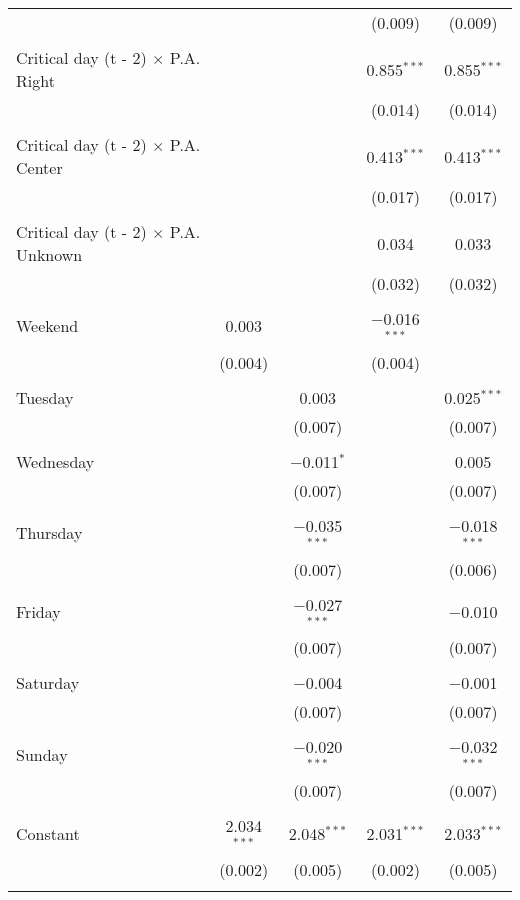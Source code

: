 \documentclass[
]{article}
\begin{document}
\begin{table}[!htbp]
{\begin{tabular}{@{\extracolsep{5pt}}lcccc}
  &  &  & (0.009) & (0.009) \\ 
  & & & & \\ 
 Critical day (t - 2) $\times$ P.A. Right &  &  & 0.855$^{***}$ & 0.855$^{***}$ \\ 
  &  &  & (0.014) & (0.014) \\ 
  & & & & \\ 
 Critical day (t - 2) $\times$ P.A. Center &  &  & 0.413$^{***}$ & 0.413$^{***}$ \\ 
  &  &  & (0.017) & (0.017) \\ 
  & & & & \\ 
 Critical day (t - 2) $\times$ P.A. Unknown &  &  & 0.034 & 0.033 \\ 
  &  &  & (0.032) & (0.032) \\ 
  & & & & \\ 
 Weekend & 0.003 &  & $-$0.016$^{***}$ &  \\ 
  & (0.004) &  & (0.004) &  \\ 
  & & & & \\ 
 Tuesday &  & 0.003 &  & 0.025$^{***}$ \\ 
  &  & (0.007) &  & (0.007) \\ 
  & & & & \\ 
 Wednesday &  & $-$0.011$^{*}$ &  & 0.005 \\ 
  &  & (0.007) &  & (0.007) \\ 
  & & & & \\ 
 Thursday &  & $-$0.035$^{***}$ &  & $-$0.018$^{***}$ \\ 
  &  & (0.007) &  & (0.006) \\ 
  & & & & \\ 
 Friday &  & $-$0.027$^{***}$ &  & $-$0.010 \\ 
  &  & (0.007) &  & (0.007) \\ 
  & & & & \\ 
 Saturday &  & $-$0.004 &  & $-$0.001 \\ 
  &  & (0.007) &  & (0.007) \\ 
  & & & & \\ 
 Sunday &  & $-$0.020$^{***}$ &  & $-$0.032$^{***}$ \\ 
  &  & (0.007) &  & (0.007) \\ 
  & & & & \\ 
 Constant & 2.034$^{***}$ & 2.048$^{***}$ & 2.031$^{***}$ & 2.033$^{***}$ \\ 
  & (0.002) & (0.005) & (0.002) & (0.005) \\ 
  & & & & \\ 

\end{tabular}}
\end{table}
\end{document}
